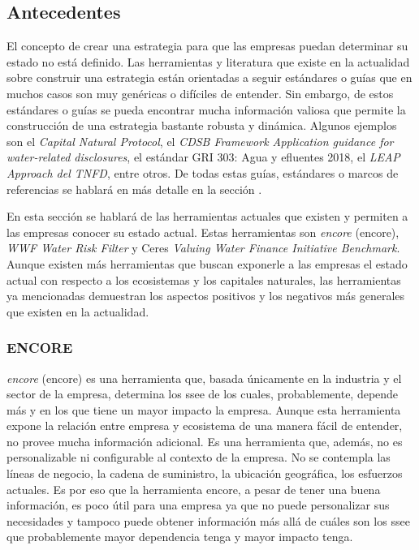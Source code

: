 \subsection{Antecedentes} \label{subsec:antecedentes}
El concepto de crear una estrategia para que las empresas puedan determinar su estado no está definido. Las herramientas y literatura que existe en la actualidad sobre construir una estrategia están orientadas a seguir estándares o guías que en muchos casos son muy genéricas o difíciles de entender. Sin embargo, de estos estándares o guías se pueda encontrar mucha información valiosa que permite la construcción de una estrategia bastante robusta y dinámica.  Algunos ejemplos son el \textit{Capital Natural Protocol}, el \textit{CDSB Framework Application guidance for water-related disclosures}, el estándar GRI 303: Agua y efluentes 2018, el \textit{LEAP Approach del TNFD}, entre otros. De todas estas guías, estándares o marcos de referencias se hablará en más detalle en la sección .

\hfill

En esta sección se hablará de las herramientas actuales que existen y permiten a las empresas conocer su estado actual. Estas herramientas son \textit{\acrlong{encore}} (\acrshort{encore}), \textit{WWF Water Risk Filter} y Ceres \textit{Valuing Water Finance Initiative Benchmark}. Aunque existen más herramientas que buscan exponerle a las empresas el estado actual con respecto a los ecosistemas y los capitales naturales, las herramientas ya mencionadas demuestran los aspectos positivos y los negativos más generales que existen en la actualidad.

\subsubsection{ENCORE} \label{subsubsec:encore}
\textit{\acrlong{encore}} (\acrshort{encore}) es una herramienta que, basada únicamente en la industria y el sector de la empresa, determina los \acrshort{ssee} de los cuales, probablemente, depende más y en los que tiene un mayor impacto la empresa. Aunque esta herramienta expone la relación entre empresa y ecosistema de una manera fácil de entender, no provee mucha información adicional. Es una herramienta que, además, no es personalizable ni configurable al contexto de la empresa. No se contempla las líneas de negocio, la cadena de suministro, la ubicación geográfica, los esfuerzos actuales. Es por eso que la herramienta \acrshort{encore}, a pesar de tener una buena información, es poco útil para una empresa ya que no puede personalizar sus necesidades y tampoco puede obtener información más allá de cuáles son los \acrshort{ssee} que probablemente mayor dependencia tenga y mayor impacto tenga. 


